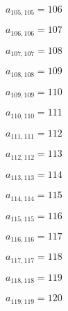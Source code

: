 \documentclass[a4paper,12pt]{article}
\begin{document}
$a _{ 105, 105 } = 106$

$a _{ 106, 106 } = 107$

$a _{ 107, 107 } = 108$

$a _{ 108, 108 } = 109$

$a _{ 109, 109 } = 110$

$a _{ 110, 110 } = 111$

$a _{ 111, 111 } = 112$

$a _{ 112, 112 } = 113$

$a _{ 113, 113 } = 114$

$a _{ 114, 114 } = 115$

$a _{ 115, 115 } = 116$

$a _{ 116, 116 } = 117$

$a _{ 117, 117 } = 118$

$a _{ 118, 118 } = 119$

$a _{ 119, 119 } = 120$
\end{document}
